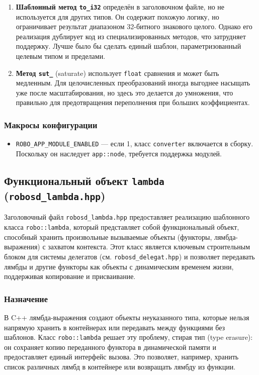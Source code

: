 \documentclass[a4paper,12pt]{article}
\begin{document}
\begin{enumerate}
    \item \textbf{Шаблонный метод \texttt{to\_i32}} определён в заголовочном файле, но не используется для других типов. Он содержит похожую логику, но ограничивает результат диапазоном 32-битного знакового целого. Однако его реализация дублирует код из специализированных методов, что затрудняет поддержку. Лучше было бы сделать единый шаблон, параметризованный целевым типом и пределами.

    \item \textbf{Метод \texttt{sut\_}} (saturate) использует \texttt{float} сравнения и может быть медленным. Для целочисленных преобразований иногда выгоднее насыщать уже после масштабирования, но здесь это делается до умножения, что правильно для предотвращения переполнения при больших коэффициентах.
\end{enumerate}

\subsubsection{Макросы конфигурации}

\begin{itemize}
    \item \texttt{ROBO\_APP\_MODULE\_ENABLED} — если 1, класс \texttt{converter} включается в сборку. Поскольку он наследует \texttt{app::node}, требуется поддержка модулей.
\end{itemize}

\subsection{Функциональный объект \texttt{lambda} (\texttt{robosd\_lambda.hpp})}

Заголовочный файл \texttt{robosd\_lambda.hpp} предоставляет реализацию шаблонного класса \texttt{robo::lambda}, который представляет собой функциональный объект, способный хранить произвольные вызываемые объекты (функторы, лямбда-выражения) с захватом контекста. Этот класс является ключевым строительным блоком для системы делегатов (см. \texttt{robosd\_delegat.hpp}) и позволяет передавать лямбды и другие функторы как объекты с динамическим временем жизни, поддерживая копирование и присваивание.

\subsubsection{Назначение}

В C++ лямбда-выражения создают объекты неуказанного типа, которые нельзя напрямую хранить в контейнерах или передавать между функциями без шаблонов. Класс \texttt{robo::lambda} решает эту проблему, стирая тип (type erasure): он сохраняет копию переданного функтора в динамической памяти и предоставляет единый интерфейс вызова. Это позволяет, например, хранить список различных лямбд в контейнере или возвращать лямбду из функции.
\end{document}
